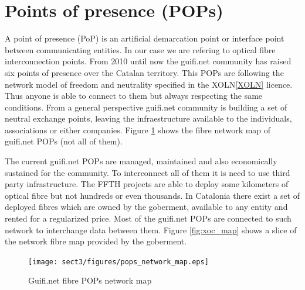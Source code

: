\section{Points of presence (POPs)}

A point of presence (PoP) is an artificial demarcation point or interface point between communicating entities.
In our case we are refering to optical fibre interconnection points.
From 2010 until now the guifi.net community has raised six points of presence over the Catalan territory.
This POPs are following the network model of freedom and neutrality specified in the XOLN\ref{XOLN} licence.
Thus anyone is able to connect to them but always respecting the same conditions.
From a general perspective guifi.net community is building a set of neutral exchange points, leaving the
infraestructure available to the individuals, associations or either companies.
\medskip
Figure \ref{fig:fibre_map} shows the fibre network map of guifi.net POPs (not all of them).

\bigskip

The current guifi.net POPs are managed, maintained and also economically sustained for the community. 
To interconnect all of them it is need to use third party infrastructure. The FFTH projects are able to deploy some kilometers
of optical fibre but not hundreds or even thousands.
\newline
In Catalonia there exist a set of deployed fibres which are owned by the goberment, available to any entity and 
rented for a regularized price. Most of the guifi.net POPs are connected to such network to interchange data
between them. Figure \ref{fig:xoc_map} shows a slice of the network fibre map provided by the goberment. 

\begin{figure}[htbp]
  \centering
  \texttt{[image: sect3/figures/pops\_network\_map.eps]} 
  \caption{Guifi.net fibre POPs network map}
  \label{fig:fibre_map}
\end{figure}

